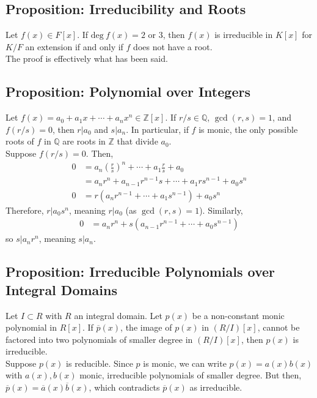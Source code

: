 \documentclass[10pt]{extarticle}
\newcommand{\Q}{\mathbb{Q}}
\newcommand{\Z}{\mathbb{Z}}
\begin{document}
  \subsection{Proposition: Irreducibility and Roots}%
  Let $f(x)\in F[x]$. If $\text{deg}~f(x) = 2 $ or $3$, then $f(x)$ is irreducible in $K[x]$ for $K/F$ an extension if and only if $f$ does not have a root.\\

  The proof is effectively what has been said.
  \subsection{Proposition: Polynomial over Integers}%
  Let $f(x) = a_0 + a_1x + \cdots + a_nx^n \in \Z[x]$. If $r/s \in \Q$, $\gcd(r,s) = 1$, and $f(r/s) = 0$, then $r | a_0$ and $s | a_n$. In particular, if $f$ is monic, the only possible roots of $f$ in $\Q$ are roots in $\Z$ that divide $a_0$.\\

  Suppose $f(r/s) = 0$. Then,
  \begin{align*}
    0 &= a_n \left(\frac{r}{s}\right)^n + \cdots + a_1 \frac{r}{s} + a_0\\
      &= a_nr^n + a_{n-1}r^{n-1}s + \cdots + a_1rs^{n-1} + a_0s^n\\
    0 &= r\left(a_nr^{n-1} + \cdots + a_1s^{n-1}\right) + a_0s^{n}
  \end{align*}
  Therefore, $r|a_0 s^{n}$, meaning $r|a_0$ (as $\gcd(r,s) = 1$). Similarly,
  \begin{align*}
    0 &= a_nr^{n} + s\left(a_{n-1}r^{n-1} + \cdots + a_0s^{n-1}\right)
  \end{align*}
  so $s|a_nr^n$, meaning $s|a_n$.
  \subsection{Proposition: Irreducible Polynomials over Integral Domains}%
  Let $I\subset R$ with $R$ an integral domain. Let $p(x)$ be a non-constant monic polynomial in $R[x]$. If $\overline{p}(x)$, the image of $p(x)$ in $(R/I)[x]$, cannot be factored into two polynomials of smaller degree in $(R/I)[x]$, then $p(x)$ is irreducible.\\

  Suppose $p(x)$ is reducible. Since $p$ is monic, we can write $p(x) = a(x)b(x)$ with $a(x),b(x)$ monic, irreducible polynomials of smaller degree. But then, $\overline{p}(x) = \overline{a}(x) \overline{b}(x)$, which contradicts $\overline{p}(x)$ as irreducible.
\end{document}
